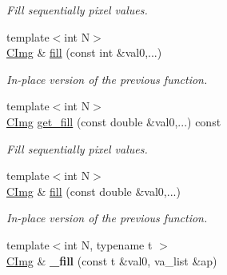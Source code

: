 \begin{DoxyCompactItemize}
\begin{DoxyCompactList}\small\item\em Fill sequentially pixel values. \end{DoxyCompactList}\item 
\hypertarget{structcimg__library_1_1_c_img_abd64bb4c06ec63897b7870ae1a1df81f}{{\footnotesize template$<$int N$>$ }\\\hyperlink{structcimg__library_1_1_c_img}{C\-Img} \& \hyperlink{structcimg__library_1_1_c_img_abd64bb4c06ec63897b7870ae1a1df81f}{fill} (const int \&val0,...)}\label{structcimg__library_1_1_c_img_abd64bb4c06ec63897b7870ae1a1df81f}

\begin{DoxyCompactList}\small\item\em In-\/place version of the previous function. \end{DoxyCompactList}\item 
\hypertarget{structcimg__library_1_1_c_img_a084a6fd53d8759212ff030bbcb36e4a2}{{\footnotesize template$<$int N$>$ }\\\hyperlink{structcimg__library_1_1_c_img}{C\-Img} \hyperlink{structcimg__library_1_1_c_img_a084a6fd53d8759212ff030bbcb36e4a2}{get\-\_\-fill} (const double \&val0,...) const }\label{structcimg__library_1_1_c_img_a084a6fd53d8759212ff030bbcb36e4a2}

\begin{DoxyCompactList}\small\item\em Fill sequentially pixel values. \end{DoxyCompactList}\item 
\hypertarget{structcimg__library_1_1_c_img_a87cd58cdfca6e9625d309a1f32ed45c8}{{\footnotesize template$<$int N$>$ }\\\hyperlink{structcimg__library_1_1_c_img}{C\-Img} \& \hyperlink{structcimg__library_1_1_c_img_a87cd58cdfca6e9625d309a1f32ed45c8}{fill} (const double \&val0,...)}\label{structcimg__library_1_1_c_img_a87cd58cdfca6e9625d309a1f32ed45c8}

\begin{DoxyCompactList}\small\item\em In-\/place version of the previous function. \end{DoxyCompactList}\item 
\hypertarget{structcimg__library_1_1_c_img_ad2e7c438a0b59660e8838b2fb2c2904f}{{\footnotesize template$<$int N, typename t $>$ }\\\hyperlink{structcimg__library_1_1_c_img}{C\-Img} \& {\bfseries \-\_\-fill} (const t \&val0, va\-\_\-list \&ap)}\label{structcimg__library_1_1_c_img_ad2e7c438a0b59660e8838b2fb2c2904f}


\end{DoxyCompactItemize}
